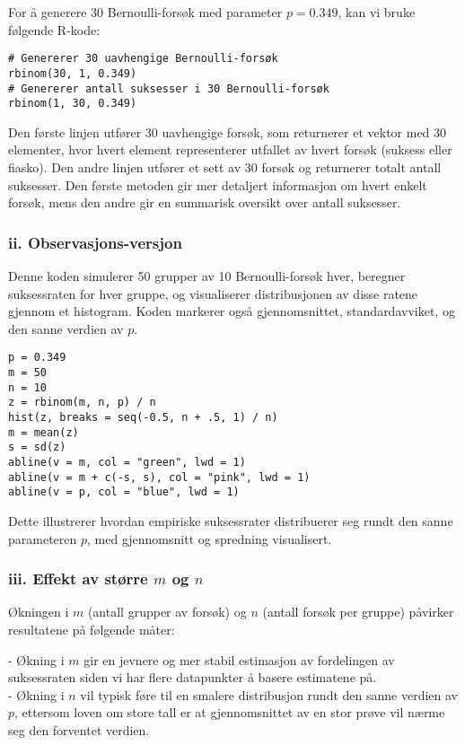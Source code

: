 \documentclass{article}
\begin{document}
For å generere 30 Bernoulli-forsøk med parameter \(p = 0.349\), kan vi bruke følgende R-kode:

\begin{verbatim}
# Genererer 30 uavhengige Bernoulli-forsøk
rbinom(30, 1, 0.349)
# Genererer antall suksesser i 30 Bernoulli-forsøk
rbinom(1, 30, 0.349)
\end{verbatim}

Den første linjen utfører 30 uavhengige forsøk, som returnerer et vektor med 30 elementer, hvor hvert element representerer utfallet av hvert forsøk (suksess eller fiasko). Den andre linjen utfører et sett av 30 forsøk og returnerer totalt antall suksesser. Den første metoden gir mer detaljert informasjon om hvert enkelt forsøk, mens den andre gir en summarisk oversikt over antall suksesser.

\subsubsection*{ii. Observasjons-versjon}

Denne koden simulerer 50 grupper av 10 Bernoulli-forsøk hver, beregner suksessraten for hver gruppe, og visualiserer distribusjonen av disse ratene gjennom et histogram. Koden markerer også gjennomsnittet, standardavviket, og den sanne verdien av \(p\).

\begin{verbatim}
p = 0.349
m = 50
n = 10
z = rbinom(m, n, p) / n
hist(z, breaks = seq(-0.5, n + .5, 1) / n)
m = mean(z)
s = sd(z)
abline(v = m, col = "green", lwd = 1)
abline(v = m + c(-s, s), col = "pink", lwd = 1)
abline(v = p, col = "blue", lwd = 1)
\end{verbatim}

Dette illustrerer hvordan empiriske suksessrater distribuerer seg rundt den sanne parameteren \(p\), med gjennomsnitt og spredning visualisert.

\subsubsection*{iii. Effekt av større \(m\) og \(n\)}

Økningen i \(m\) (antall grupper av forsøk) og \(n\) (antall forsøk per gruppe) påvirker resultatene på følgende måter:

- Økning i \(m\) gir en jevnere og mer stabil estimasjon av fordelingen av suksessraten siden vi har flere datapunkter å basere estimatene på.\\
- Økning i \(n\) vil typisk føre til en smalere distribusjon rundt den sanne verdien av \(p\), ettersom loven om store tall er at gjennomsnittet av en stor prøve vil nærme seg den forventet verdien.
\end{document}

